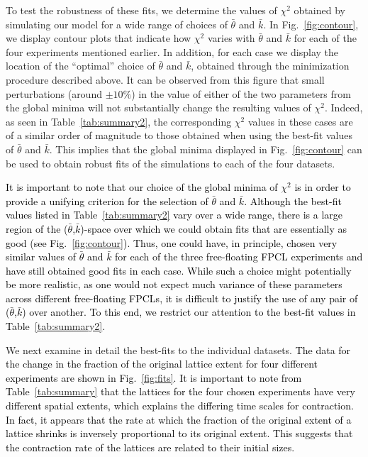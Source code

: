 To test the robustness of these fits, we determine the values of $\chi^2$ obtained by simulating our model for a wide range of choices of $\bar{\theta}$ and $\bar{k}$. In Fig.~\ref{fig:contour}, we display contour plots that indicate how $\chi^2$ varies with $\bar{\theta}$ and $\bar{k}$ for each of the four experiments mentioned earlier. In addition, for each case we display the location of the ``optimal'' choice of $\bar{\theta}$ and $\bar{k}$, obtained through the minimization procedure described above. It can be observed from this figure that small perturbations (around $\pm10\%$) in the value of either of the two parameters from the global minima will not substantially change the resulting values of $\chi^2$. Indeed, as seen in Table~\ref{tab:summary2}, the corresponding $\chi^2$ values in these cases are of a similar order of magnitude to those obtained when using the best-fit values of $\bar{\theta}$ and $\bar{k}$. This implies that the global minima displayed in Fig.~\ref{fig:contour} can be used to obtain robust fits of the simulations to each of the four datasets.

\textcolor{black}{It is important to note that our choice of the global minima of $\chi^2$ is in order to provide a unifying criterion for the selection of $\bar{\theta}$ and $\bar{k}$. Although the best-fit values listed in Table~\ref{tab:summary2} vary over a wide range, there is a large region of the ($\bar{\theta}$,$\bar{k}$)-space over which we could obtain fits that are essentially as good (see Fig.~\ref{fig:contour}). Thus, one could have, in principle, chosen very similar values of $\bar{\theta}$ and $\bar{k}$ for each of the three free-floating FPCL experiments and have still obtained good fits in each case. While such a choice might potentially be more realistic, as one would not expect much variance of these parameters across different free-floating FPCLs, it is difficult to justify the use of any pair of ($\bar{\theta}$,$\bar{k}$) over another. To this end, we restrict our attention to the best-fit values in Table~\ref{tab:summary2}.}%

We next examine in detail the best-fits to the individual datasets. \textcolor{black}{The data for the change in the fraction of the original lattice extent for four different experiments are shown in Fig.~\ref{fig:fits}. It is important to note from Table~\ref{tab:summary} that the lattices for the four chosen experiments have very different spatial extents, which explains the differing time scales for contraction. In fact, it appears that the rate at which the fraction of the original extent of a lattice shrinks is inversely proportional to its original extent. This suggests that the contraction rate of the lattices are related to their initial sizes.}

